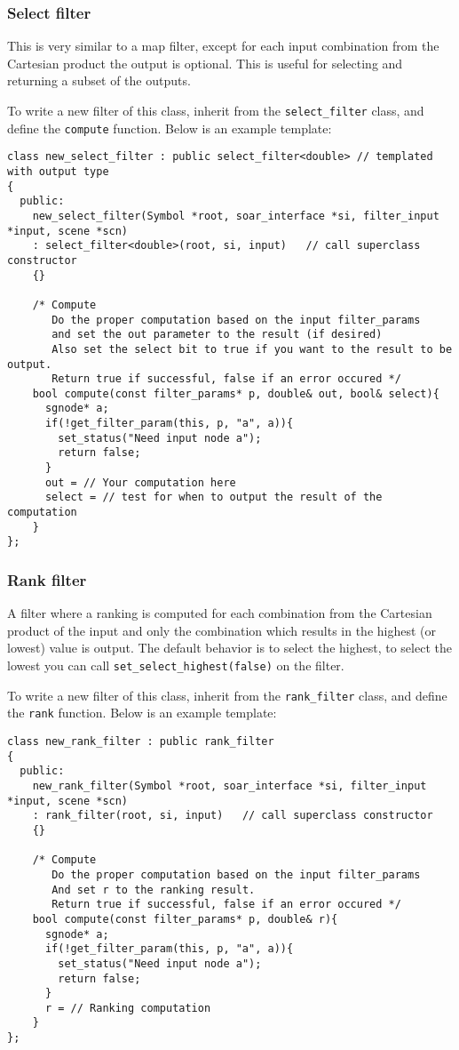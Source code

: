 \subsubsection{Select filter}
This is very similar to a map filter, except for each input combination from the 
Cartesian product the output is optional. This is useful for selecting and returning
a subset of the outputs. 

To write a new filter of this class, inherit from the \texttt{select\_filter} class, 
and define the \texttt{compute} function. Below is an example template:

\begin{verbatim}
class new_select_filter : public select_filter<double> // templated with output type
{
  public:
    new_select_filter(Symbol *root, soar_interface *si, filter_input *input, scene *scn)
    : select_filter<double>(root, si, input)   // call superclass constructor
    {}

    /* Compute
       Do the proper computation based on the input filter_params 
       and set the out parameter to the result (if desired)
       Also set the select bit to true if you want to the result to be output. 
       Return true if successful, false if an error occured */
    bool compute(const filter_params* p, double& out, bool& select){
      sgnode* a;
      if(!get_filter_param(this, p, "a", a)){
        set_status("Need input node a");
        return false;
      }
      out = // Your computation here
      select = // test for when to output the result of the computation
    }
};
\end{verbatim}

\subsubsection{Rank filter}
A filter where a ranking is computed for each combination from the Cartesian
product of the input and only the combination which results in the highest 
(or lowest) value is output. The default behavior is to select the highest, 
to select the lowest you can call \texttt{set\_select\_highest(false)} on the filter.

To write a new filter of this class, inherit from the \texttt{rank\_filter} class, 
and define the \texttt{rank} function. Below is an example template:

\begin{verbatim}
class new_rank_filter : public rank_filter
{
  public:
    new_rank_filter(Symbol *root, soar_interface *si, filter_input *input, scene *scn)
    : rank_filter(root, si, input)   // call superclass constructor
    {}

    /* Compute
       Do the proper computation based on the input filter_params 
       And set r to the ranking result. 
       Return true if successful, false if an error occured */
    bool compute(const filter_params* p, double& r){
      sgnode* a;
      if(!get_filter_param(this, p, "a", a)){
        set_status("Need input node a");
        return false;
      }
      r = // Ranking computation
    }
};
\end{verbatim}

